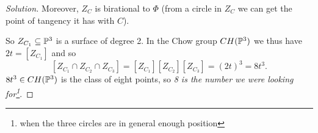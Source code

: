 \begin{proof}[Solution]
Moreover, $Z_C$ is birational to $\Phi$ (from a circle in $Z_C$ we can get the point of tangency it has with $C$).

So $Z_{C_1}\subseteq\mathbb{P}^3$ is a surface of degree 2. In the Chow group $CH(\mathbb{P}^3)$ we thus have $2t=[Z_{C_1}]$ and so
\[[Z_{C_1}\cap Z_{C_2}\cap Z_{C_3}]=[Z_{C_1}][Z_{C_2}][Z_{C_3}]=(2t)^3=8t^3.\]
$8t^3\in CH(\mathbb{P}^3)$ is the class of eight points, so \textit{8 is the number we were looking for\footnote{when the three circles are in general enough position}}.
\end{proof}
















